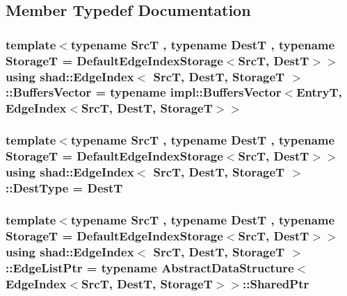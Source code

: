 \subsection{Member Typedef Documentation}
\hypertarget{classshad_1_1EdgeIndex_af749b171d243a86058fffe96247d42f5}{
\subsubsection[{Buffers\-Vector}]{\setlength{\rightskip}{0pt plus 5cm}template$<$typename Src\-T , typename Dest\-T , typename Storage\-T  = Default\-Edge\-Index\-Storage$<$\-Src\-T, Dest\-T$>$$>$ using {\bf shad\-::\-Edge\-Index}$<$ Src\-T, Dest\-T, Storage\-T $>$\-::{\bf Buffers\-Vector} =  typename impl\-::\-Buffers\-Vector$<${\bf Entry\-T}, {\bf Edge\-Index}$<$Src\-T, Dest\-T, Storage\-T$>$$>$}}\label{classshad_1_1EdgeIndex_af749b171d243a86058fffe96247d42f5}
\hypertarget{classshad_1_1EdgeIndex_a1fe85e04eb8fbc43233e1656e93ca4fd}{
\subsubsection[{Dest\-Type}]{\setlength{\rightskip}{0pt plus 5cm}template$<$typename Src\-T , typename Dest\-T , typename Storage\-T  = Default\-Edge\-Index\-Storage$<$\-Src\-T, Dest\-T$>$$>$ using {\bf shad\-::\-Edge\-Index}$<$ Src\-T, Dest\-T, Storage\-T $>$\-::{\bf Dest\-Type} =  Dest\-T}}\label{classshad_1_1EdgeIndex_a1fe85e04eb8fbc43233e1656e93ca4fd}
\hypertarget{classshad_1_1EdgeIndex_ae6b70863258ef3efebc3868e5c791a0d}{
\subsubsection[{Edge\-List\-Ptr}]{\setlength{\rightskip}{0pt plus 5cm}template$<$typename Src\-T , typename Dest\-T , typename Storage\-T  = Default\-Edge\-Index\-Storage$<$\-Src\-T, Dest\-T$>$$>$ using {\bf shad\-::\-Edge\-Index}$<$ Src\-T, Dest\-T, Storage\-T $>$\-::{\bf Edge\-List\-Ptr} =  typename {\bf Abstract\-Data\-Structure}$<$ {\bf Edge\-Index}$<$Src\-T, Dest\-T, Storage\-T$>$$>$\-::{\bf Shared\-Ptr}}}\label{classshad_1_1EdgeIndex_ae6b70863258ef3efebc3868e5c791a0d}

